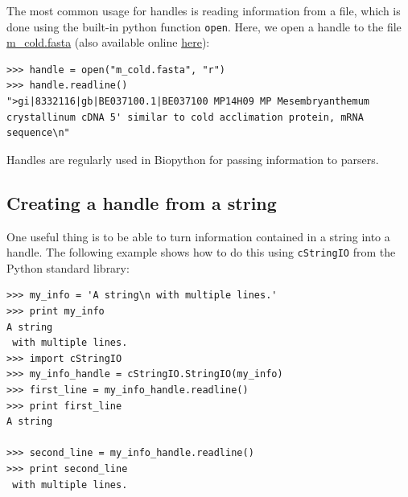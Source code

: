 \documentclass{report}
\begin{document}
The most common usage for handles is reading information from a file,
which is done using the built-in python function \verb|open|. Here, we open a
handle to the file \href{examples/m\_cold.fasta}{m\_cold.fasta}
(also available online
\href{http://biopython.org/DIST/docs/tutorial/examples/m\_cold.fasta}{here}):

\begin{verbatim}
>>> handle = open("m_cold.fasta", "r")
>>> handle.readline()
">gi|8332116|gb|BE037100.1|BE037100 MP14H09 MP Mesembryanthemum crystallinum cDNA 5' similar to cold acclimation protein, mRNA sequence\n"
\end{verbatim}

Handles are regularly used in Biopython for passing information to parsers.

\subsection{Creating a handle from a string}

One useful thing is to be able to turn information contained in a
string into a handle. The following example shows how to do this using 
\verb|cStringIO| from the Python standard library:

\begin{verbatim}
>>> my_info = 'A string\n with multiple lines.'
>>> print my_info
A string
 with multiple lines.
>>> import cStringIO
>>> my_info_handle = cStringIO.StringIO(my_info)
>>> first_line = my_info_handle.readline()
>>> print first_line
A string

>>> second_line = my_info_handle.readline()
>>> print second_line
 with multiple lines.
\end{verbatim}
\end{document}
